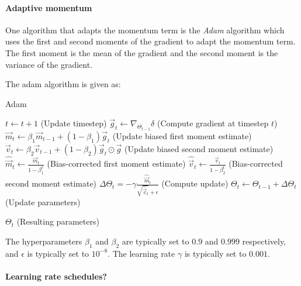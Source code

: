         \paragraph{Adaptive momentum} 
        One algorithm that adapts the momentum term is the \textit{Adam} algorithm  which uses the first and second moments of the gradient to adapt the momentum term. The first moment is the mean of the gradient and the second moment is the variance of the gradient. 

        The adam algorithm is given as:
        \begin{algorithm}[h!]
            \caption{Adam}
            \label{alg:ML:NN:adam}
            \begin{algorithmic}[1]
                \Require{Learning rate $\gamma$, decay rates $\beta_1$, $\beta_2$ $\in [0,1)$, first moment $\vec{m}=\vec{0}$, second moment $\vec{v}=\vec{0}$, weight decay rate $\epsilon$ (for numerical stability), initial parameters $\Theta_0$, and timestep $t=0$.}
                    \State $t \leftarrow t + 1$ (Update timestep)
                    \State $\vec{g}_t \leftarrow \nabla_{\Theta_{t-1}}\delta$ (Compute gradient at timestep $t$)
                    \State $\vec{m}_t \leftarrow \beta_1\vec{m}_{t-1} + (1-\beta_1)\vec{g}_t$ (Update biased first moment estimate)
                    \State $\vec{v}_t \leftarrow \beta_2\vec{v}_{t-1} + (1-\beta_2)\vec{g}_t\odot\vec{g}$ (Update biased second moment estimate)
                    \State $\hat{\vec{m}}_t \leftarrow \frac{\vec{m}_t}{1-\beta_1^t}$ (Bias-corrected first moment estimate)
                    \State $\hat{\vec{v}}_t \leftarrow \frac{\vec{v}_t}{1-\beta_2^t}$ (Bias-corrected second moment estimate)
                    \State $\Delta\Theta_t = - \gamma\frac{\hat{\vec{m}}_t}{\sqrt{\hat{\vec{v}}_t}+\epsilon}$ (Compute update)
                    \State $\Theta_{t} \leftarrow \Theta_{t-1} +\Delta\Theta_t$ (Update parameters)
                \EndWhile

                \Return $\Theta_t$ (Resulting parameters)
            \end{algorithmic}
        \end{algorithm}
        The hyperparameters $\beta_1$ and $\beta_2$ are typically set to $0.9$ and $0.999$ respectively, and $\epsilon$ is typically set to $10^{-8}$. The learning rate $\gamma$ is typically set to $0.001$. 

        \paragraph{Learning rate schedules?}

